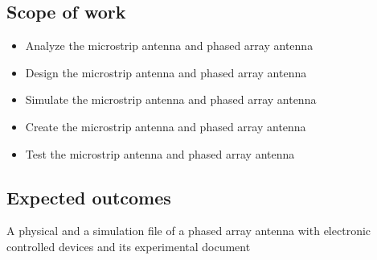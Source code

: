 \documentclass[11pt,a4paper]{article}
\begin{document}
    \subsection{Scope of work}
      \begin{itemize}
        \item Analyze the microstrip antenna and phased array antenna
        \item Design the microstrip antenna and phased array antenna
        \item Simulate the microstrip antenna and phased array antenna
        \item Create the microstrip antenna and phased array antenna
        \item Test the microstrip antenna and phased array antenna
      \end{itemize}

    \subsection{Expected outcomes}
      \indent A physical and a simulation file of a phased array antenna with electronic controlled devices and its experimental document
  
    \newpage

     
    
\end{document}
